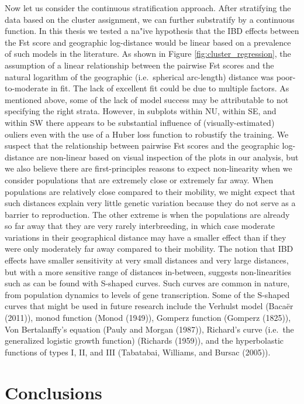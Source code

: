 \documentclass[
  letterpaper,
  DIV=11,
  numbers=noendperiod]{scrreprt}
\begin{document}
Now let us consider the continuous stratification approach. After
stratifying the data based on the cluster assignment, we can further
substratify by a continuous function. In this thesis we tested a na"ive
hypothesis that the IBD effects between the Fst score and geographic
log-distance would be linear based on a prevalence of such models in the
literature. As shown in Figure \ref{fig:cluster_regression}, the
assumption of a linear relationship between the pairwise Fst scores and
the natural logarithm of the geographic (i.e.~spherical arc-length)
distance was poor-to-moderate in fit. The lack of excellent fit could be
due to multiple factors. As mentioned above, some of the lack of model
success may be attributable to not specifying the right strata. However,
in subplots within NU, within SE, and within SW there appears to be
substantial influence of (visually-estimated) ouliers even with the use
of a Huber loss function to robustify the training. We suspect that the
relationship between pairwise Fst scores and the geographic log-distance
are non-linear based on visual inspection of the plots in our analysis,
but we also believe there are first-principles reasons to expect
non-linearity when we consider populations that are extremely close or
extremely far away. When populations are relatively close compared to
their mobility, we might expect that such distances explain very little
genetic variation because they do not serve as a barrier to
reproduction. The other extreme is when the populations are already so
far away that they are very rarely interbreeding, in which case moderate
variations in their geographical distance may have a smaller effect than
if they were only moderately far away compared to their mobility. The
notion that IBD effects have smaller sensitivity at very small distances
and very large distances, but with a more sensitive range of distances
in-between, suggests non-linearities such as can be found with S-shaped
curves. Such curves are common in nature, from population dynamics to
levels of gene transcription. Some of the S-shaped curves that might be
used in future research include the Verhulst model (Bacaër (2011)),
monod function (Monod (1949)), Gomperz function (Gomperz (1825)), Von
Bertalanffy's equation (Pauly and Morgan (1987)), Richard's curve
(i.e.~the generalized logistic growth function) (Richards (1959)), and
the hyperbolastic functions of types I, II, and III (Tabatabai,
Williams, and Bursac (2005)).

\section{Conclusions}\label{conclusions}
\end{document}
